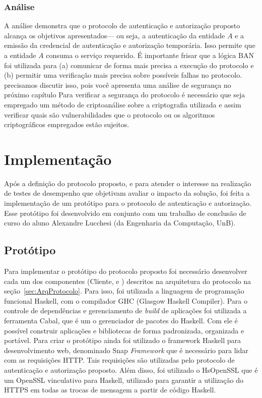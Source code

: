 \subsubsection{Análise}

A análise demonstra que o protocolo de autenticação e autorização proposto alcança os objetivos apresentados--- ou seja, a autenticação da entidade ${A}$ e a emissão da credencial de autenticação e autorização temporária. Isso permite que a entidade ${A}$ consuma o serviço requerido. É importante frisar que a lógica BAN foi utilizada para (a) comunicar 
de forma mais precisa a execução do protocolo e (b) permitir uma verifica\c c\~{a}o mais precisa sobre possíveis falhas no protocolo.
{\color{blue}precisamos discutir isso, pois voc\^{e} apresenta uma an\'{a}lise de seguran\c ca no pr\'{o}ximo cap\'{i}tulo} Para verificar a segurança do protocolo é necessário que seja empregado um método de criptoanálise sobre a criptografia utilizada e assim verificar quais são vulnerabilidades que o protocolo ou os algoritmos criptográficos empregados estão sujeitos.


\section{Implementação}\label{sec:implementacao}

Após a definição do protocolo proposto, e para atender o interesse na realização de testes de desempenho que objetivam avaliar o impacto da solução, 
foi feita a implementa\c c\~{a}o de um protótipo para o protocolo de autenticação e autorização. Esse protótipo foi desenvolvido em conjunto com um 
trabalho de conclus\~{a}o de curso do aluno Alexandre Lucchesi (da Engenharia da Computa\c c\~{a}o, UnB).

\subsection{Protótipo}

Para implementar o protótipo do protocolo proposto foi necessário desenvolver cada um dos componentes (Cliente, \servidorAA e \servidorRest) descritos na arquitetura 
do protocolo na seção~\ref{sec:ArqProtocolo}. Para isso, foi utilizada a linguagem de programação funcional Haskell, com o compilador GHC (Glasgow Haskell Compiler). 
Para o controle de dependências e gerenciamento de \emph{build} de aplicações foi utilizada a ferramenta Cabal, que é um o gerenciador de pacotes do Haskell. Com ele é possível construir aplicações e bibliotecas de forma padronizada, organizada e portável. Para criar o protótipo ainda foi utilizado o framework Haskell para desenvolvimento web, denominado Snap \emph{Framework} que é necessário para lidar com as requisições HTTP. Tais requisi\c c\~{o}es são utilizadas pelo protocolo de autenticação e autorização proposto. Além disso, foi utilizado o HsOpenSSL que é um OpenSSL {\color{red}vinculativo} para Haskell, utilizado para garantir a utilização do HTTPS em todas as trocas de mensagem a partir de código Haskell.

